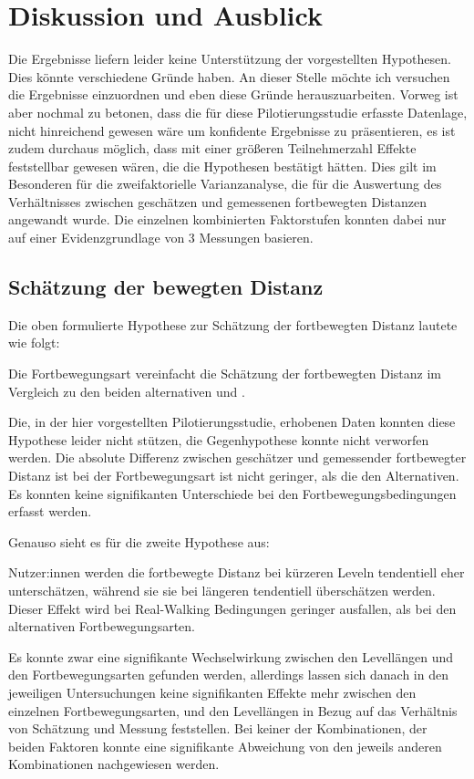     \section{Diskussion und Ausblick}
        Die Ergebnisse liefern leider keine Unterstützung der vorgestellten Hypothesen. Dies könnte verschiedene Gründe haben. An dieser Stelle möchte ich versuchen die Ergebnisse einzuordnen und eben diese Gründe herauszuarbeiten.
        Vorweg ist aber nochmal zu betonen, dass die für diese Pilotierungsstudie erfasste Datenlage, nicht hinreichend gewesen wäre um konfidente Ergebnisse zu präsentieren, es ist zudem  durchaus möglich, dass mit einer größeren Teilnehmerzahl Effekte feststellbar gewesen wären, die die Hypothesen bestätigt hätten. Dies gilt im Besonderen für die zweifaktorielle Varianzanalyse, die für die Auswertung des Verhältnisses zwischen geschätzen und gemessenen fortbewegten Distanzen angewandt wurde. Die einzelnen kombinierten Faktorstufen konnten dabei nur auf einer Evidenzgrundlage von 3 Messungen basieren.

        \subsection{Schätzung der bewegten Distanz}
            Die oben formulierte Hypothese zur Schätzung der fortbewegten Distanz lautete wie folgt:

            Die  Fortbewegungsart vereinfacht die Schätzung der fortbewegten Distanz im Vergleich zu den beiden alternativen  und .

            Die, in der hier vorgestellten Pilotierungsstudie, erhobenen Daten konnten diese Hypothese leider nicht stützen, die Gegenhypothese konnte nicht verworfen werden. Die absolute Differenz zwischen geschätzer und gemessender fortbewegter Distanz ist bei der Fortbewegungsart  ist nicht geringer, als die den Alternativen. Es konnten keine signifikanten  Unterschiede bei den Fortbewegungsbedingungen erfasst werden.

            Genauso sieht es für die zweite Hypothese aus:

            Nutzer:innen werden die fortbewegte Distanz bei kürzeren Leveln tendentiell eher unterschätzen, während sie sie bei längeren tendentiell überschätzen werden. Dieser Effekt wird bei Real-Walking Bedingungen geringer ausfallen, als bei den alternativen Fortbewegungsarten.

            Es konnte zwar eine signifikante Wechselwirkung zwischen den Levellängen und den Fortbewegungsarten gefunden werden, allerdings lassen sich danach in den jeweiligen Untersuchungen keine signifikanten Effekte mehr zwischen den einzelnen Fortbewegungsarten, und den Levellängen in Bezug auf das Verhältnis von Schätzung und Messung feststellen. Bei keiner der Kombinationen, der beiden Faktoren konnte eine signifikante Abweichung von den jeweils anderen Kombinationen nachgewiesen werden.

